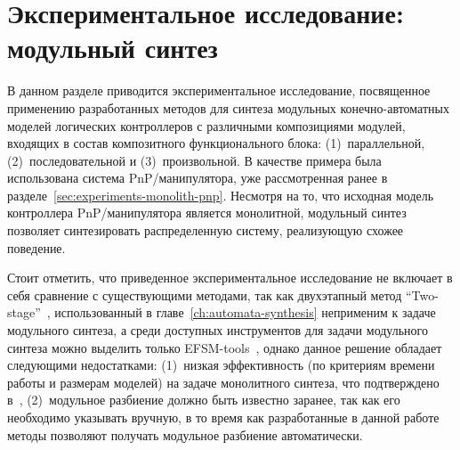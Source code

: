 % 
\section{Экспериментальное исследование: модульный синтез}%
\label{sec:experiments-modular}



В данном разделе приводится экспериментальное исследование, посвященное применению разработанных методов для синтеза модульных конечно-автоматных моделей логических контроллеров с различными композициями модулей, входящих в состав композитного функционального блока: (1)~параллельной, (2)~последовательной и (3)~произвольной.
В качестве примера была использована система PnP\-/манипулятора, уже рассмотренная ранее в разделе~\ref{sec:experiments-monolith-pnp}.
Несмотря на то, что исходная модель контроллера PnP\-/манипулятора является монолитной, модульный синтез позволяет синтезировать распределенную систему, реализующую схожее поведение.

Стоит отметить, что приведенное экспериментальное исследование не включает в себя сравнение с существующими методами, так как двухэтапный метод \enquote{Two-stage}~\cite{chivilikhin-19}, использованный в главе~\ref{ch:automata-synthesis} неприменим к задаче модульного синтеза, а среди доступных инструментов для задачи модульного синтеза можно выделить только EFSM-tools~\cite{efsm-tools}, однако данное решение обладает следующими недостатками: (1)~низкая эффективность (по критериям времени работы и размерам моделей) на задаче монолитного синтеза, что подтверждено в~\cite{chivilikhin-19}, (2)~модульное разбиение должно быть известно заранее, так как его необходимо указывать вручную, в то время как разработанные в данной работе методы позволяют получать модульное разбиение автоматически.


